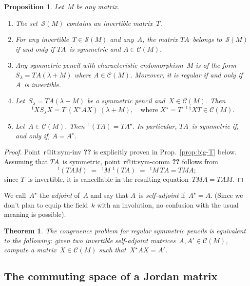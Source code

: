 \documentclass{article}%
\makeatletter
\newtheorem{prop}{Proposition}
\newtheorem{thm}{Theorem}
\def\labelenumi{(\roman{enumi})}
\def\itemref#1{\expandafter\ifx\csname r@#1\endcsname\relax
  {\bfseries ??}\else{\setcounter{enumi}{\ref{#1}}\labelenumi}\fi}
\let\ro\mathscr
\def\transpose{\,{}^{\mathrm{t}\!}}
\makeatother
\begin{document}
\begin{prop}\label{prop:structure-sym}
Let~$M$ be any matrix.
\begin{enumerate}
\item \label{it:sym-inv} The set~$\ro S(M)$ contains an invertible
matrix~$T$.
\item \label{it:sym-comm} For any invertible~$T ∈ \ro S(M)$ and any~$A$,
the matrix $TA$~belongs to~$\ro S(M)$ if and only if $TA$~is symmetric
and $A ∈ \ro C(M)$.
\item Any symmetric pencil with characteristic endomorphism~$M$ is of the
form~$S_{λ} = TA (λ + M)$ where $A ∈ \ro C(M)$. Moreover, it is regular
if and only if $A$~is invertible.
\item Let~$S_{λ} = TA (λ + M)$ be a symmetric pencil and~$X ∈ \ro C(M)$.
Then
\begin{equation*}
\transpose{X} S_{λ} X = T \:(X^{⋆} A X)\: (λ + M), \quad
\text{where $X^{⋆} = T^{-1} \transpose{X} T ∈ \ro C(M)$.}
\end{equation*}
\item Let~$A ∈ \ro C(M)$. Then $\transpose{(TA)} = TA^{⋆}$. In
particular, $TA$~is symmetric if, and only if, $A = A^{⋆}$.
\end{enumerate}
\end{prop}

\begin{proof}
Point~\itemref{it:sym-inv} is explicitly proven in Prop.~\ref{prop:big-T}
below. Assuming that $TA$~is symmetric, point~\itemref{it:sym-comm}
follows from
\begin{equation}
\transpose{(TAM)} \;=\; \transpose{M}\, \transpose{(TA)}
 \;=\; \transpose{M}\,TA = TMA;
\end{equation}
since $T$~is invertible, it is cancellable in the resulting equation~$TMA
= TAM$.
\end{proof}

We call~$A^{⋆}$ the \emph{adjoint} of~$A$ and say that $A$~is
\emph{self-adjoint} if~$A^{⋆} = A$. (Since we don't plan to equip the
field~$k$ with an involution, no confusion with the usual meaning is
possible).

\begin{thm}\label{thm:IP1S-congruence}
The congruence problem for regular symmetric pencils is equivalent to the
following: given two invertible self-adjoint matrices~$A, A' ∈ \ro C(M)$,
compute a matrix~$X ∈ \ro C(M)$ such that~$X^{⋆} A X = A'$.
\end{thm}

\subsection{The commuting space of a Jordan matrix}%
\end{document}
